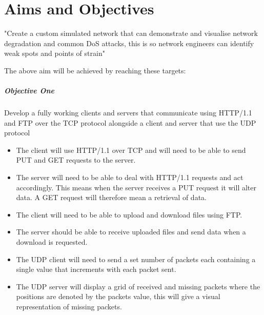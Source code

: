 \chapter{Aims and Objectives}
\begin{center}
"Create a custom simulated network that can demonstrate and visualise network degradation and common DoS attacks, this is so network engineers can identify weak spots and points of strain"
\end{center}


The above aim will be achieved by reaching these targets:

\paragraph{Objective One}
Develop a fully working clients and servers that communicate using HTTP/1.1 \citep{HTTP} and FTP over the TCP protocol alongside a client and server that use the UDP protocol

\begin{itemize}
\item The client will use HTTP/1.1  over TCP and will need to be able to send PUT and GET requests to the server.
\item The server will need to be able to deal with HTTP/1.1 requests and act accordingly. This means when the server receives a PUT request it will alter data. A GET request will therefore mean a retrieval of data. 
\item The client will need to be able to upload and download files using FTP.
\item The server should be able to receive uploaded files and send data when a download is requested.
\item The UDP client will need to send a set number of packets each containing a single value that increments with each packet sent.
\item The UDP server will display a grid of received and missing packets where the positions are denoted by the packets value, this will give a visual representation of missing packets.
\end{itemize}  

